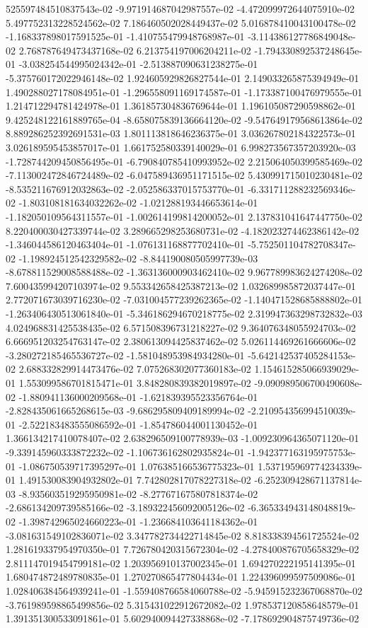 525597484510837543e-02	-9.971914687042987557e-02	-4.472099972644075910e-02	5.497752313228524562e-02	7.186460502028449437e-02	5.016878410043100478e-02	-1.168337898017591525e-01	-1.410755479948768987e-01	-3.114386127786849048e-02	2.768787649473437168e-02	6.213754197006204211e-02	-1.794330892537248645e-01	-3.038254544995024342e-01	-2.513887090631238275e-01	-5.375760172022946148e-02	1.924605929826827544e-01	2.149033265875394949e-01	1.490288027178084951e-01	-1.296558091169174587e-01	-1.173387100476979555e-01	1.214712294781424978e-01	1.361857304836769644e-01	1.196105087290598862e-01	9.425248122161889765e-04	-8.658075839136664120e-02	-9.547649179568613864e-02	8.889286252392691531e-03	1.801113818646236375e-01	3.036267802184322573e-01	3.026189595453857017e-01	1.661752580339140029e-01	6.998273567357203920e-03	-1.728744209450856495e-01	-6.790840785410993952e-02	2.215064050399585469e-02	-7.113002472846724489e-02	-6.047589436951171515e-02	5.430991715010230481e-02	-8.535211676912032863e-02	-2.052586337015753770e-01	-6.331711288232569346e-02	-1.803108181634032262e-02	-1.021288193446653614e-01	-1.182050109564311557e-01	-1.002614199814200052e-01	2.137831041647447750e-02	8.220400030427339744e-02	3.289665298253680731e-02	-4.182023274462386142e-02	-1.346044586120463404e-01	-1.076131168877702410e-01	-5.752501104782708347e-02	-1.198924512542329582e-02	-8.844190080505997739e-03	-8.678811529008588488e-02	-1.363136000903462410e-02	9.967789983624274208e-02	7.600435994207103974e-02	9.553342658425387213e-02	1.032689985872037447e-01	2.772071673039716230e-02	-7.031004577239262365e-02	-1.140471528685888802e-01	-1.263406430513061840e-01	-5.346186294670218775e-02	2.319947363298732832e-03	4.024968831425538435e-02	6.571508396731218227e-02	9.364076348055924703e-02	6.666951203254763147e-02	2.380613094425837462e-02	5.026114469261666606e-02	-3.280272185465536727e-02	-1.581048953984934280e-01	-5.642142537405284153e-02	2.688332829914473476e-02	7.075268302077360183e-02	1.154615285066939029e-01	1.553099586701815471e-01	3.848280839382019897e-02	-9.090989506700490608e-02	-1.880941136000209568e-01	-1.621839395523356764e-01	-2.828435061665268615e-03	-9.686295809409189994e-02	-2.210954356994510039e-01	-2.522183483555086592e-01	-1.854786044001130452e-01	1.366134217410078407e-02	2.638296509100778939e-03	-1.009230964365071120e-01	-9.339145960333872232e-02	-1.106736162802935824e-01	-1.942377163195975753e-01	-1.086750539717395297e-01	1.076385166536775323e-01	1.537195969774234339e-01	1.491530083904932802e-01	7.742802817078227318e-02	-6.252309428671137814e-03	-8.935603519295950981e-02	-8.277671675807818374e-02	-2.686134209739585166e-02	-3.189322456092005126e-02	-6.365334943148048819e-02	-1.398742965024660223e-01	-1.236684103641184362e-01	-3.081631549102836071e-02	3.347782734422714845e-02	8.818338394561725524e-02	1.281619337954970350e-01	7.726780420315672304e-02	-4.278400876705658329e-02	2.811147019454799181e-02	1.203956910137002345e-01	1.694270222195141395e-01	1.680474872489780835e-01	1.270270865477804434e-01	1.224396099597509086e-01	1.028406384564939241e-01	-1.559408766584060788e-02	-5.945915232367068870e-02	-3.761989598865499856e-02	5.315431022912672082e-02	1.978537120858648579e-01	1.391351300533091861e-01	5.602940094427338868e-02	-7.178692904875749736e-02
